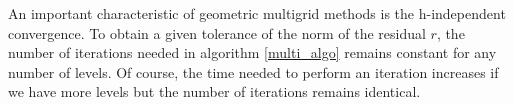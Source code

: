 An important characteristic of geometric multigrid methods is the h-independent convergence. To obtain a given tolerance of the norm of the residual $r$, the number of iterations needed in algorithm \ref{multi_algo} remains constant for any number of levels. Of course, the time needed to perform an iteration increases if we have more levels but the number of iterations remains identical. 














